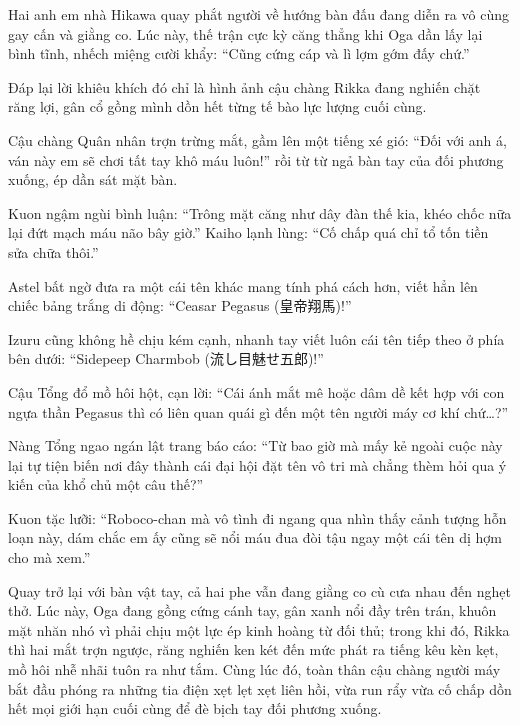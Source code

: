 \documentclass[../main.tex]{subfiles}
\begin{document}
Hai anh em nhà Hikawa quay phắt người về hướng bàn đấu đang diễn ra vô cùng gay cấn và giằng co. Lúc này, thế trận cực kỳ căng thẳng khi Oga dần lấy lại bình tĩnh, nhếch miệng cười khẩy: ``Cũng cứng cáp và lì lợm gớm đấy chứ.''

Đáp lại lời khiêu khích đó chỉ là hình ảnh cậu chàng Rikka đang nghiến chặt răng lợi, gân cổ gồng mình dồn hết từng tế bào lực lượng cuối cùng.

Cậu chàng Quân nhân trợn trừng mắt, gầm lên một tiếng xé gió: ``Đối với anh á, ván này em sẽ chơi tất tay khô máu luôn!'' rồi từ từ ngả bàn tay của đối phương xuống, ép dần sát mặt bàn.


Kuon ngậm ngùi bình luận: ``Trông mặt căng như dây đàn thế kia, khéo chốc nữa lại đứt mạch máu não bây giờ.''  Kaiho lạnh lùng: ``Cố chấp quá chỉ tổ tốn tiền sửa chữa thôi.''

Astel bất ngờ đưa ra một cái tên khác mang tính phá cách hơn, viết hẳn lên chiếc bảng trắng di động: ``Ceasar Pegasus (皇帝翔馬)!''

Izuru cũng không hề chịu kém cạnh, nhanh tay viết luôn cái tên tiếp theo ở phía bên dưới: ``Sidepeep Charmbob (流し目魅せ五郎)!''


Cậu Tổng đổ mồ hôi hột, cạn lời: ``Cái ánh mắt mê hoặc dâm dề kết hợp với con ngựa thần Pegasus thì có liên quan quái gì đến một tên người máy cơ khí chứ\dots?''

Nàng Tổng ngao ngán lật trang báo cáo: ``Từ bao giờ mà mấy kẻ ngoài cuộc này lại tự tiện biến nơi đây thành cái đại hội đặt tên vô tri mà chẳng thèm hỏi qua ý kiến của khổ chủ một câu thế?''

Kuon tặc lưỡi: ``Roboco-chan mà vô tình đi ngang qua nhìn thấy cảnh tượng hỗn loạn này, dám chắc em ấy cũng sẽ nổi máu đua đòi tậu ngay một cái tên dị hợm cho mà xem.''

Quay trở lại với bàn vật tay, cả hai phe vẫn đang giằng co cù cưa nhau đến nghẹt thở. Lúc này, Oga đang gồng cứng cánh tay, gân xanh nổi đầy trên trán, khuôn mặt nhăn nhó vì phải chịu một lực ép kinh hoàng từ đối thủ; trong khi đó, Rikka thì hai mắt trợn ngược, răng nghiến ken két đến mức phát ra tiếng kêu kèn kẹt, mồ hôi nhễ nhãi tuôn ra như tắm. Cùng lúc đó, toàn thân cậu chàng người máy bắt đầu phóng ra những tia điện xẹt lẹt xẹt liên hồi, vừa run rẩy vừa cố chấp dồn hết mọi giới hạn cuối cùng để đè bịch tay đối phương xuống.

\end{document}
